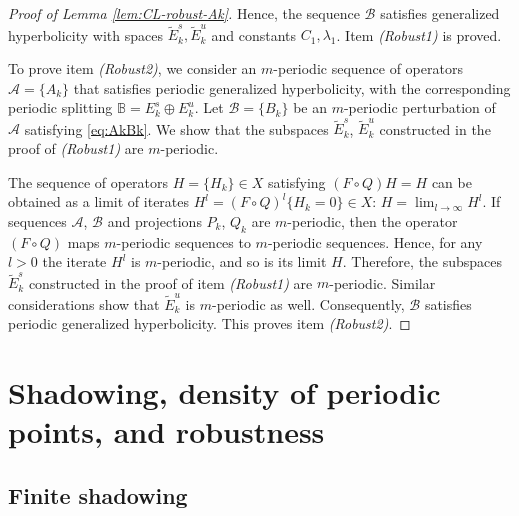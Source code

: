 \documentclass[12pt]{article}
\newcommand{\Bb}{\mathbb{B}}
\theoremstyle{definition}
\begin{document}
\begin{proof}[Proof of Lemma \ref{lem:CL-robust-Ak}]
Hence, the sequence $\mathcal{B}$ satisfies generalized hyperbolicity with spaces $\tilde{E}_k^s, \tilde{E}_k^u$ and constants $C_1, \lambda_1$. Item \textit{(Robust1)} is proved.

To prove item \textit{(Robust2)}, we consider an $m$-periodic sequence of operators $\mathcal{A} = \{A_k\}$ that satisfies periodic generalized hyperbolicity, with the corresponding periodic splitting $\Bb = E_k^s \oplus E_k^u$. Let $\mathcal{B} = \{B_k\}$ be an $m$-periodic perturbation of $\mathcal{A}$ satisfying \eqref{eq:AkBk}. We show that the subspaces $\tilde{E}_k^s$, $\tilde{E}_k^u$ constructed in the proof of  \textit{(Robust1)}  are $m$-periodic. 

The sequence of operators $H = \{H_k\} \in X$ satisfying $(F \circ Q)H = H$ can be obtained as a limit of iterates $H^l = (F \circ Q)^l\{H_k = 0\} \in X$:
$
H = \lim_{l \to \infty}H^l.
$
If sequences  $\mathcal{A}$, $\mathcal{B}$ and projections $P_k$, $Q_k$ are $m$-periodic, then the operator $(F \circ Q)$ maps $m$-periodic sequences to $m$-periodic sequences. Hence, for any $l>0$ the iterate $H^l$ is $m$-periodic, and so is its limit $H$. Therefore, the subspaces $\tilde{E}_k^s$ constructed in the proof of item \textit{(Robust1)} are $m$-periodic.  Similar considerations show that $\tilde{E}_k^u$ is $m$-periodic as well. Consequently, $\mathcal{B}$ satisfies periodic generalized hyperbolicity. This proves item \textit{(Robust2)}.
\end{proof}


\section{Shadowing, density of periodic points, and robustness}\label{sec:proofsSh}

\subsection{Finite shadowing} \label{sec:proofFinLipSh}
\end{document}
